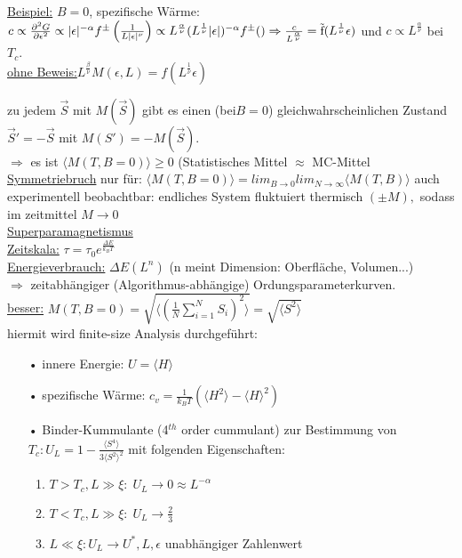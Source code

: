 \documentclass[12pt]{article}
\begin{document}
\underline{Beispiel:} $B=0$, spezifische Wärme: $c\propto \frac{\partial^2 G}{\partial \epsilon^2} \propto \vert \epsilon \vert^{-\alpha} f^\pm \left( \frac{1}{L \vert \epsilon \vert^\nu}\right) \propto L^\frac{\alpha}{\nu} (L^\frac{1}{\nu} \vert \epsilon \vert)^{-\alpha} f^\pm() \\
\Rightarrow \frac{c}{L^\frac{\alpha}{\nu}} = \text{\~{f}} (L^\frac{1}{\nu} \epsilon)$ und $c \propto L^\frac{\alpha}{\nu}$ bei $T_c$.\\
\underline{ohne Beweis:}$ L^\frac{\beta}{\nu} M(\epsilon,L)=f(L^\frac{1}{\nu} \epsilon)$

 
zu jedem $\vec{S}$ mit $M(\vec{S})$ gibt es einen (bei$ B=0$) gleichwahrscheinlichen Zustand $\vec{S}'= -\vec{S}$ mit $M(S') = - M(\vec{S})$. \\
$\Rightarrow$ es ist $\langle M(T,B=0)  \rangle \geq 0$ (Statistisches Mittel $\approx$ MC-Mittel \\
\underline{Symmetriebruch} nur für: $ \langle M(T,B=0) \rangle = lim_{B \to 0} lim_{N \to \infty} \langle M(T,B) \rangle $
auch experimentell beobachtbar: endliches System fluktuiert thermisch $(\pm M),$ sodass im zeitmittel $M \to 0$
\\
\underline{Superparamagnetismus} \\
\underline{Zeitskala:} $\tau = \tau_0 e^\frac{\Delta E}{k_B T}$ \\
\underline{Energieverbrauch:} $\Delta E(L^n)$ (n meint Dimension: Oberfläche, Volumen...)\\ %
$\Rightarrow$ zeitabhängiger (Algorithmus-abhängige) Ordungsparameterkurven. \\
\underline{besser:} $M(T,B=0) = \sqrt{\langle \left( \frac{1}{N} \sum_{i=1}^N S_i \right)^2 \rangle} = \sqrt{\langle S^2 \rangle}$ \\
hiermit wird finite-size Analysis durchgeführt:
\begin{itemize}
\item[•] innere Energie: $U= \langle H \rangle$
\item[•] spezifische Wärme: $c_v= \frac{1}{k_B T} \left( \langle H ^2 \rangle - \langle H \rangle^2 \right) $
\item[•] Binder-Kummulante (4$^{th}$ order cummulant) zur Bestimmung von $T_c: U_L = 1-  \frac{\langle S^4 \rangle}{3 \langle S^2 \rangle^2}$ mit folgenden Eigenschaften:
\begin{enumerate}
\item $T > T_c , L \gg \xi: \; U_L \to 0 \approx L^{- \alpha}$
\item $ T< T_c, L \gg \xi: \; U_L \to \frac{2}{3}$
\item $L \ll \xi: U_L \to U^*, L, \epsilon$ unabhängiger Zahlenwert
\end{enumerate}

\end{itemize}
\end{document}
